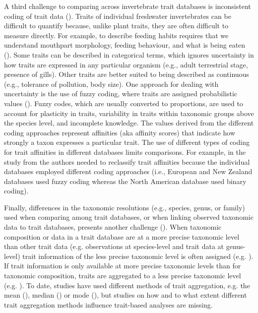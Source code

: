 \documentclass[12pt]{article}
\begin{document}
A third challenge to comparing across invertebrate trait databases is inconsistent coding of trait data (\cite{culp_incorporating_2011}). Traits of individual freshwater invertebrates can be difficult to quantify because, unlike plant traits, they are often difficult to measure directly. For example, to describe feeding habits requires that we understand mouthpart morphology, feeding behaviour, and what is being eaten (\cite{moogFaunaAquaticaAustriaca2017}). Some traits can be described in categorical terms, which ignores uncertainty in how traits are expressed in any particular organism (e.g., adult terrestrial stage, presence of gills). Other traits are better suited to being described as continuous (e.g., tolerance of pollution, body size). One approach for dealing with uncertainty is the use of fuzzy coding, where traits are assigned probabilistic values (\cite{chevenet_francois_fuzzy_1994}). Fuzzy codes, which are usually converted to proportions, are used to account for plasticity in traits, variability in traits within taxonomic groups above the species level, and incomplete knowledge. The values derived from the different coding approaches represent affinities (aka affinity scores) that indicate how strongly a taxon expresses a particular trait. The use of different types of coding for trait affinities in different databases limits comparisons. For example, in the study from \citet{brown_functional_2018} the authors needed to reclassify trait affinities because the individual databases employed different coding approaches (i.e., European and New Zealand databases used fuzzy coding whereas the North American database used binary coding). 

Finally, differences in the taxonomic resolutions (e.g., species, genus, or family) used when comparing among trait databases, or when linking observed taxonomic data to trait databases, presents another challenge (\cite{gayraudInvertebrateTraitsBiomonitoring2003, doledecAccurateDescriptionAbundance2000}). When taxonomic composition or data in a trait database are at a more precise taxonomic level than other trait data (e.g. observations at species-level and trait data at genus-level) trait information of the less precise taxonomic level is often assigned (e.g. \cite{szocs_effects_2014, vos_taxonomic_2017}). If trait information is only available at more precise taxonomic levels than for taxonomic composition, traits are aggregated to a less precise taxonomic level (e.g. \cite{aspin_extreme_2019, piliere_a._f._h._importance_2016, poff_functional_2006, szocs_effects_2014}). To date, studies have used different methods of trait aggregation, e.g. the mean (\cite{magliozzi_functional_2019}), median (\cite{szocs_effects_2014}) or mode (\cite{piliere_a._f._h._importance_2016}), but studies on how and to what extent different trait aggregation methods influence trait-based analyses are missing. 
\end{document}
